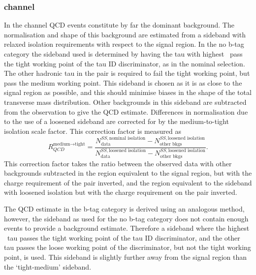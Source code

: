 \subsubsection{\texorpdfstring{\tautau channel}{tau tau channel}}
\label{sec:mssm_bkgs_qcd_tt}
In the \tautau channel QCD events constitute by far the dominant background.
The normalisation and shape 
of this background are estimated from a sideband with relaxed 
isolation requirements with respect to the signal region. 
In the no b-tag category the sideband used is determined
by having the tau with highest \pT~pass the tight working
point of the tau ID discriminator, as in the nominal selection.
The other hadronic tau in the pair is required to fail the tight working point,
but pass the medium working point. This sideband is 
chosen as it is as close to the signal region as possible, and 
this should minimise biases in the shape of the total transverse mass
distribution. Other backgrounds
in this sideband are subtracted from the observation to give
the QCD estimate. Differences in normalisation due to
the use of a loosened sideband are corrected for by the medium-to-tight isolation
scale factor. This correction factor is measured as
\begin{equation}\label{eqn:tautau_qcd}
R_{QCD}^{\text{medium}\rightarrow\text{tight}} = \frac{N_{\text{data}}^{SS,\text{nominal isolation}}-N_{\text{other bkgs}}^{SS,\text{loosened isolation}}}{N_{\text{data}}^{SS,\text{loosened isolation}}-N_{\text{other bkgs}}^{SS,\text{loosened isolation}}}.
\end{equation}
This correction factor takes the ratio between the observed data with other
backgrounds subtracted in the region equivalent to the signal region, but with the
charge requirement of the pair inverted, and the region equivalent to the sideband
with loosened isolation but with the charge requirement on the pair inverted.

The QCD estimate in the b-tag category is derived using an analogous method, 
 however, the sideband as used for the 
no b-tag category does not contain enough events to 
provide a background estimate. Therefore a sideband where
the highest \pT~tau passes the tight working point of the
tau ID discriminator, and the other tau passes the loose working
point of the discriminator, but not the tight working point, is used.
This sideband is slightly further away from the signal region than the
`tight-medium' sideband. %

